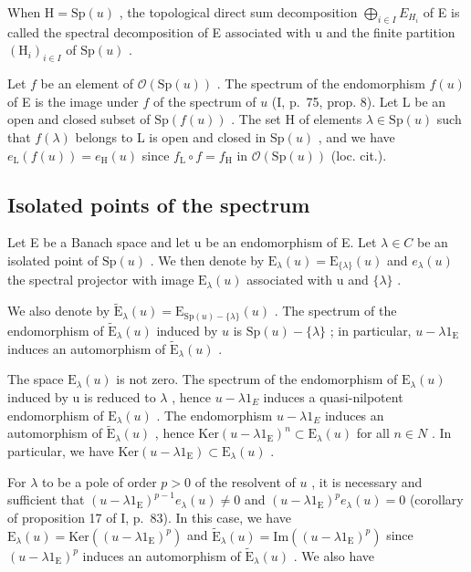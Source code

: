 When \(\mathrm{H} = \mathrm{Sp}(u)\) , the topological direct sum decomposition \(\bigoplus_{i \in I} E_{H_i}\) of E is called the spectral decomposition of E associated with u and the finite partition \((\mathrm{H}_i)_{i \in I}\) of \(\mathrm{Sp}(u)\) .

Let \(f\) be an element of \(\mathcal{O}(\mathrm{Sp}(u))\) . The spectrum of the endomorphism \(f(u)\) of E is the image under \(f\) of the spectrum of \(u\) (I, p.~75, prop. 8). Let L be an open and closed subset of \(\mathrm{Sp}(f(u))\) . The set H of elements \(\lambda \in \mathrm{Sp}(u)\) such that \(f(\lambda)\) belongs to L is open and closed in \(\mathrm{Sp}(u)\) , and we have \(e_{\mathrm{L}}(f(u)) = e_{\mathrm{H}}(u)\) since \(f_{\mathrm{L}} \circ f = f_{\mathrm{H}}\) in \(\mathcal{O}(\mathrm{Sp}(u))\) (loc. cit.).

\subsection{Isolated points of the spectrum}

Let E be a Banach space and let u be an endomorphism of E. Let \(\lambda\in C\) be an isolated point of \(\mathrm{Sp}(u)\) . We then denote by \(\mathrm{E}_{\lambda}(u)=\mathrm{E}_{\{\lambda\}}(u)\) and \(e_{\lambda}(u)\) the spectral projector with image \(\mathrm{E}_{\lambda}(u)\) associated with u and \(\{\lambda\}\) .

We also denote by \(\widetilde{\mathrm{E}}_{\lambda}(u) = \mathrm{E}_{\mathrm{Sp}(u) - \{\lambda\}}(u)\) . The spectrum of the endomorphism of \(\widetilde{\mathrm{E}}_{\lambda}(u)\) induced by \(u\) is \(\mathrm{Sp}(u) - \{\lambda\}\) ; in particular, \(u - \lambda 1_{\mathrm{E}}\) induces an automorphism of \(\widetilde{\mathrm{E}}_{\lambda}(u)\) .

The space \(\mathrm{E}_{\lambda}(u)\) is not zero. The spectrum of the endomorphism of \(\mathrm{E}_{\lambda}(u)\) induced by u is reduced to \(\lambda\) , hence \(u - \lambda1_{E}\) induces a quasi-nilpotent endomorphism of \(\mathrm{E}_{\lambda}(u)\) . The endomorphism \(u - \lambda1_{E}\) induces an automorphism of \(\widetilde{\mathrm{E}}_{\lambda}(u)\) , hence \(\mathrm{Ker}(u - \lambda1_{\mathrm{E}})^{n} \subset \mathrm{E}_{\lambda}(u)\) for all \(n \in N\) . In particular, we have \(\mathrm{Ker}(u - \lambda1_{\mathrm{E}}) \subset \mathrm{E}_{\lambda}(u)\) .

For \(\lambda\) to be a pole of order \(p > 0\) of the resolvent of \(u\) , it is necessary and sufficient that \((u - \lambda 1_{\mathrm{E}})^{p - 1}e_{\lambda}(u)\neq 0\) and \((u - \lambda 1_{\mathrm{E}})^{p}e_{\lambda}(u) = 0\) (corollary of proposition 17 of I, p.~83). In this case, we have \(\mathrm{E}_{\lambda}(u) = \mathrm{Ker}((u - \lambda 1_{\mathrm{E}})^{p})\) and \(\widetilde{\mathrm{E}}_{\lambda}(u) = \mathrm{Im}((u - \lambda 1_{\mathrm{E}})^{p})\) since \((u - \lambda 1_{\mathrm{E}})^{p}\) induces an automorphism of \(\widetilde{\mathrm{E}}_{\lambda}(u)\) . We also have

